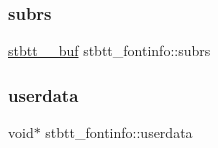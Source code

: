 \subsubsection{\texorpdfstring{subrs}{subrs}}
{\footnotesize\ttfamily \hyperlink{structstbtt____buf}{stbtt\+\_\+\+\_\+buf} stbtt\+\_\+fontinfo\+::subrs}

\hypertarget{structstbtt__fontinfo_a9c81078df96a7a3f730137151efab285}{}\label{structstbtt__fontinfo_a9c81078df96a7a3f730137151efab285} 
\subsubsection{\texorpdfstring{userdata}{userdata}}
{\footnotesize\ttfamily void$\ast$ stbtt\+\_\+fontinfo\+::userdata}

